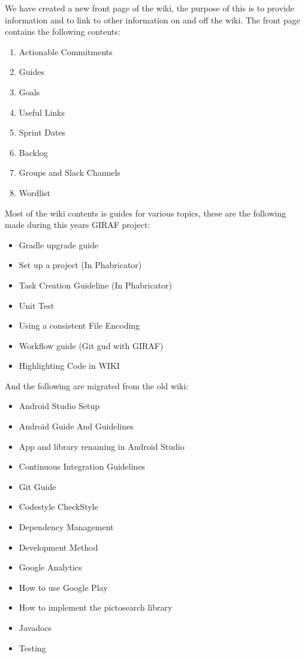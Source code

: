 We have created a new front page of the wiki, the purpose of this is to provide information and to link to other information on and off the wiki.
The front page contains the following contents: 

\begin{enumerate}
    \item Actionable Commitments
    \item Guides
    \item Goals
    \item Useful Links
    \item Sprint Dates
    \item Backlog
    \item Groups and Slack Channels
    \item Wordlist
\end{enumerate}

Most of the wiki contents is guides for various topics, these are the following made during this years GIRAF project:

\begin{itemize}
    \item Gradle upgrade guide
    \item Set up a project (In Phabricator)
    \item Task Creation Guideline (In Phabricator)
    \item Unit Test
    \item Using a consistent File Encoding
    \item Workflow guide (Git gud with GIRAF)
    \item Highlighting Code in WIKI
\end{itemize}
\bigskip
And the following are migrated from the old wiki:

\begin{itemize}
	\item Android Studio Setup
    \item Android Guide And Guidelines
    \item App and library renaming in Android Studio
    \item Continuous Integration Guidelines
    \item Git Guide
    \item Codestyle CheckStyle
    \item Dependency Management
    \item Development Method
    \item Google Analytics
    \item How to use Google Play
    \item How to implement the pictosearch library
    \item Javadocs
    \item Testing
\end{itemize}

